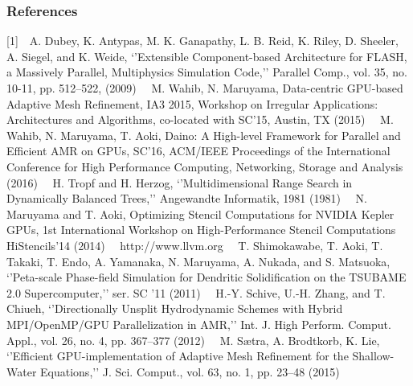 \documentclass{book}
\begin{document}
\subsubsection{References}
[1]~~A. Dubey, K. Antypas, M. K. Ganapathy, L. B. Reid, K. Riley, D. Sheeler, A. Siegel, and K. Weide, ‘’Extensible Component-based Architecture for FLASH, a Massively Parallel, Multiphysics Simulation Code,’’ Parallel Comp., vol. 35, no. 10-11, pp. 512–522, (2009) \newline
[2]~~M. Wahib, N. Maruyama, Data-centric GPU-based Adaptive Mesh Refinement, IA3 2015, Workshop on Irregular Applications: Architectures and Algorithms, co-located with SC’15, Austin, TX (2015) \newline
[3]~~M. Wahib, N. Maruyama, T. Aoki, Daino: A High-level Framework for Parallel and Efficient AMR on GPUs, SC'16, ACM/IEEE Proceedings of the International Conference for High Performance Computing, Networking, Storage and Analysis (2016) \newline
[4]~~H. Tropf and H. Herzog, ‘’Multidimensional Range Search in Dynamically Balanced Trees,’’ Angewandte Informatik, 1981 (1981) \newline
[5]~~N. Maruyama and T. Aoki, Optimizing Stencil Computations for NVIDIA Kepler GPUs, 1st International Workshop on High-Performance Stencil Computations HiStencils'14 (2014) \newline
[6]~~http://www.llvm.org \newline
[7]~~T. Shimokawabe, T. Aoki, T. Takaki, T. Endo, A. Yamanaka, N. Maruyama, A. Nukada, and S. Matsuoka, ‘’Peta-scale Phase-field Simulation for Dendritic Solidification on the TSUBAME 2.0 Supercomputer,’’ ser. SC ’11 (2011)  \newline
[8]~~H.-Y. Schive, U.-H. Zhang, and T. Chiueh, ‘’Directionally Unsplit Hydrodynamic Schemes with Hybrid MPI/OpenMP/GPU Parallelization in AMR,’’ Int. J. High Perform. Comput. Appl., vol. 26, no. 4, pp. 367–377 (2012)  \newline
[9]~~M. Sætra, A. Brodtkorb, K. Lie, ‘’Efficient GPU-implementation of Adaptive Mesh Refinement for the Shallow-Water Equations,’’ J. Sci. Comput., vol. 63, no. 1, pp. 23–48 (2015)
\end{document}
